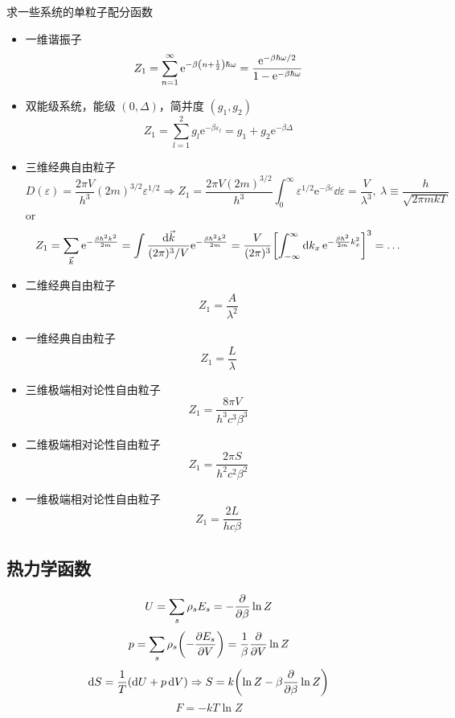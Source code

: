 \begin{framed}
    求一些系统的单粒子配分函数

    \begin{itemize}
        \item 一维谐振子 \[
                  Z_1 = \sum_{n = 1}^{\infty} \mathrm{e}^{- \beta \qty(n + \frac{1}{2}) \hbar \omega} = \frac{\mathrm{e}^{- \beta \hbar \omega / 2}}{1 - \mathrm{e}^{- \beta \hbar \omega}}
              \]
        \item 双能级系统，能级 $(0, \Delta)$，简并度 $(g_1, g_2)$ \[
                  Z_1 = \sum_{l = 1}^2 g_l \mathrm{e}^{- \beta \varepsilon_l} = g_1 + g_2 \mathrm{e}^{- \beta \Delta}
              \]
        \item 三维经典自由粒子 \[
                  D(\varepsilon) = \frac{2 \pi V}{h^3} (2 m)^{3/2} \varepsilon^{1/2} \Rightarrow Z_1 = \frac{2 \pi V (2 m)^{3/2}}{h^3} \int_0^{\infty} \varepsilon^{1/2} \mathrm{e}^{- \beta \varepsilon} \dd{\varepsilon} = \frac{V}{\lambda^3},\ \lambda \equiv \frac{h}{\sqrt{2 \pi m k T}}
              \] or \[
                  Z_1 = \sum_{\vec{k}} \mathrm{e}^{- \frac{\beta \hbar^2 k^2}{2 m}} = \int \frac{\dd{\vec{k}}}{(2 \pi)^3 / V} \mathrm{e}^{- \frac{\beta \hbar^2 k^2}{2 m}} = \frac{V}{(2 \pi)^3} \qty[\int_{- \infty}^{\infty} \dd{k_x} \mathrm{e}^{- \frac{\beta \hbar^2}{2 m} k_x^2}]^3 = \dots
              \]
        \item 二维经典自由粒子 \[
                  Z_1 = \frac{A}{\lambda^2}
              \]
        \item 一维经典自由粒子 \[
                  Z_1 = \frac{L}{\lambda}
              \]
        \item 三维极端相对论性自由粒子 \[
                  Z_1 = \frac{8 \pi V}{h^3 c^3 \beta^3}
              \]
        \item 二维极端相对论性自由粒子 \[
                  Z_1 = \frac{2 \pi S}{h^2 c^2 \beta^2}
              \]
        \item 一维极端相对论性自由粒子 \[
                  Z_1 = \frac{2 L}{h c \beta}
              \]
    \end{itemize}
\end{framed}

\subsection{热力学函数}

\[
    U = \sum_s \rho_s E_s = - \pdv{\beta} \ln{Z}
\] \[
    p = \sum_s \rho_s \qty(- \pdv{E_s}{V}) = \frac{1}{\beta} \pdv{V} \ln{Z}
\] \[
    \dd{S} = \frac{1}{T} (\dd{U} + p \dd{V}) \Rightarrow S = k \qty(\ln{Z} - \beta \pdv{\beta} \ln{Z})
\] \[
    F = - k T \ln{Z}
\]

